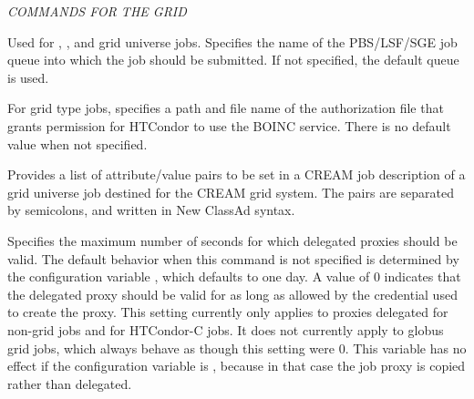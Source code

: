 \emph{COMMANDS FOR THE GRID}
\begin{description} 


\label{condor-submit-batch-queue}
\item[batch\_queue = $<$queuename$>$]
Used for , , and  
grid universe jobs.
Specifies the name of the PBS/LSF/SGE job queue into which the job should
be submitted.
If not specified, the default queue is used.


\label{condor-submit-boinc-authenticator-file}
\item[boinc\_authenticator\_file = $<$pathname$>$]
For grid type  jobs, 
specifies a path and file name of the authorization file that grants
permission for HTCondor to use the BOINC service.
There is no default value when not specified.


\label{condor-submit-cream-attributes}
\item[cream\_attributes = $<$name=value;\Dots;name=value$>$]
Provides a list of attribute/value pairs to be set in a CREAM job description
of a grid universe job destined for the CREAM grid system.
The pairs are separated by semicolons, and written in New ClassAd syntax.


\label{condor-submit-delegate-job-GSI-credentials-lifetime}
\item[delegate\_job\_GSI\_credentials\_lifetime = $<$seconds$>$]
Specifies the maximum number of seconds for which
delegated proxies should be valid.  
The default behavior when this command is not specified
is determined by the configuration variable 
, 
which defaults to one day.  
A value of 0 indicates that the delegated proxy
should be valid for as long as allowed by the credential used to
create the proxy.  This setting currently only applies to proxies
delegated for non-grid jobs and for HTCondor-C jobs.  It does not currently
apply to globus grid jobs, which always behave as though this setting
were 0.  This variable has no effect if the configuration
variable  is ,
because in that case the job proxy is copied rather than delegated.


\end{description}
